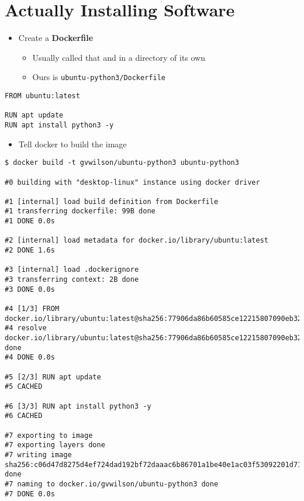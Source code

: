 \documentclass[krantzl]{krantz}
\newcommand{\glossref}[1]{\textbf{#1}}
\begin{document}
\section{Actually Installing Software}
\begin{itemize}
\item Create a \glossref{Dockerfile}\begin{itemize}
\item Usually called that and in a directory of its own

\item Ours is \texttt{ubuntu-python3/Dockerfile}

\end{itemize}


\end{itemize}
\begin{lstlisting}[frame=tblr]
FROM ubuntu:latest

RUN apt update
RUN apt install python3 -y
\end{lstlisting}

\begin{itemize}
\item Tell docker to build the image

\end{itemize}
\begin{lstlisting}[frame=tblr,backgroundcolor=\color{black!5}]
$ docker build -t gvwilson/ubuntu-python3 ubuntu-python3

#0 building with "desktop-linux" instance using docker driver

#1 [internal] load build definition from Dockerfile
#1 transferring dockerfile: 99B done
#1 DONE 0.0s

#2 [internal] load metadata for docker.io/library/ubuntu:latest
#2 DONE 1.6s

#3 [internal] load .dockerignore
#3 transferring context: 2B done
#3 DONE 0.0s

#4 [1/3] FROM docker.io/library/ubuntu:latest@sha256:77906da86b60585ce12215807090eb327e7386c8fafb5402369e421f44eff17e
#4 resolve docker.io/library/ubuntu:latest@sha256:77906da86b60585ce12215807090eb327e7386c8fafb5402369e421f44eff17e done
#4 DONE 0.0s

#5 [2/3] RUN apt update
#5 CACHED

#6 [3/3] RUN apt install python3 -y
#6 CACHED

#7 exporting to image
#7 exporting layers done
#7 writing image sha256:c06d47d8275d4ef724dad192bf72daaac6b86701a1be40e1ac03f53092201d71 done
#7 naming to docker.io/gvwilson/ubuntu-python3 done
#7 DONE 0.0s
\end{lstlisting}
\end{document}
